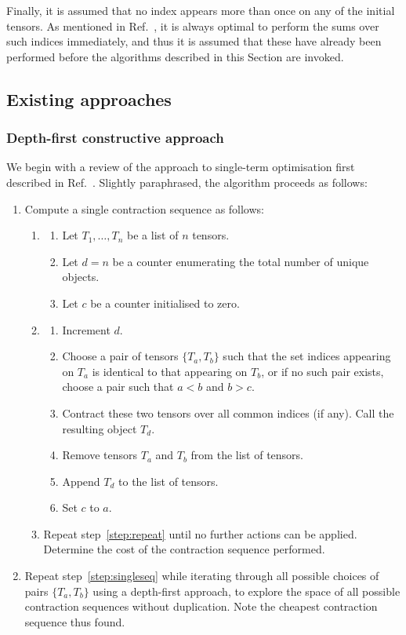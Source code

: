 \documentclass[aps,pre,reprint,superscriptaddress,amsfonts,amsmath,showpacs,nofootinbib,floatfix]{revtex4-1}
\newcommand{\rcite}[1]{Ref.~\onlinecite{#1}}
\begin{document}
Finally, it is assumed that no index appears more than once on any of the initial tensors. As mentioned in \rcite{lam1997}, it is always optimal to perform the sums over such indices immediately, and thus it is assumed that these have already been performed before the algorithms described in this Section are invoked.

\subsection{Existing approaches\label{sec:existing}}


\subsubsection{Depth-first constructive approach\label{sec:depthalg}}

We begin with a review of the approach to single-term optimisation first described in \rcite{lam1997}. 
Slightly paraphrased, the algorithm proceeds as follows:
\begin{enumerate}
\item Compute a single contraction sequence as follows: \label{step:singleseq}
\begin{enumerate}
\item
\begin{enumerate}
\item Let $T_1,\ldots,T_n$ be a list of $n$ tensors.
\item Let $d=n$ be a counter enumerating the total number of unique objects.
\item Let $c$ be a counter initialised to zero.
\end{enumerate}
\item \label{step:repeat}
\begin{enumerate}
\item Increment $d$. 
\item Choose a pair of tensors $\{T_a,T_b\}$ such that the set indices appearing on $T_a$ is identical to that appearing on $T_b$, or if no such pair exists, choose a pair such that $a<b$ and $b>c$.
\item Contract these two tensors over all common indices (if any). Call the resulting object $T_d$.
\item Remove tensors $T_a$ and $T_b$ from the list of tensors.
\item Append $T_d$ to the list of tensors.
\item Set $c$ to $a$.
\end{enumerate}
\item Repeat step~\ref{step:repeat} until no further actions can be applied. Determine the cost of the contraction sequence performed.
\end{enumerate}
\item Repeat step~\ref{step:singleseq} while iterating through all possible choices of pairs $\{T_a,T_b\}$ using a depth-first approach, to explore the space of all possible contraction sequences without duplication. Note the cheapest contraction sequence thus found.
\end{enumerate}
\end{document}
